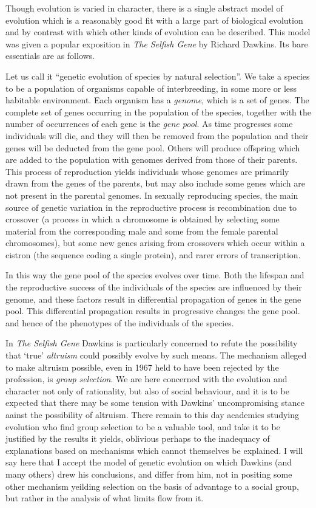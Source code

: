 \documentclass[10pt,titlepage]{article}
\begin{document}
Though evolution is varied in character, there is a single abstract model of evolution which is a reasonably good fit with a large part of biological evolution and by contrast with which other kinds of evolution can be described.
This model was given a popular exposition in \emph{The Selfish Gene}\cite{dawkinsSG} by Richard Dawkins.
Its bare essentials are as follows.

Let us call it ``genetic evolution of species by natural selection''.
We take a species to be a population of organisms capable of interbreeding, in some more or less habitable environment.
Each organism has a \emph{genome}, which is a set of genes.
The complete set of genes occurring in the population of the species, together with the number of occurrences of each gene is the \emph{gene pool}.
As time progresses some individuals will die, and they will then be removed from the population and their genes will be deducted from the gene pool.
Others will produce offspring which are added to the population with genomes derived from those of their parents.
This process of reproduction yields individuals whose genomes are primarily drawn from the genes of the parents, but may also include some genes which are not present in the parental genomes.
In sexually reproducing species, the main source of genetic variation in the reproductive process is recombination due to crossover (a process in which a chromosome is obtained by selecting some material from the corresponding male and some from the female parental chromosomes), but some new genes arising from crossovers which occur within a cistron (the sequence coding a single protein), and rarer errors of transcription. 


In this way the gene pool of the species evolves over time.
Both the lifespan and the reproductive success of the individuals of the species are influenced by their genome, and these factors result in differential propagation of genes in the gene pool.
This differential propagation results in progressive changes the gene pool. and hence of the phenotypes of the individuals of the species.

In \emph{The Selfish Gene} Dawkins is particularly concerned to refute the possibility that `true' \emph{altruism} could possibly evolve by such means.
The mechanism alleged to make altruism possible, even in 1967 held to have been rejected by the profession, is \emph{group selection}.
We are here concerned with the evolution and character not only of rationality, but also of social behaviour, and it is to be expected that there may be some tension with Dawkins' uncompromising stance aainst the possibility of altruism.
There remain to this day academics studying evolution who find group selection to be a valuable tool, and take it to be justified by the results it yields, oblivious perhaps to the inadequacy of explanations based on mechanisms which cannot themselves be explained.
I will say here that I accept the model of genetic evolution on which Dawkins (and many others) drew his conclusions, and differ from him, not in positing some other mechanism yeilding selection on the basis of advantage to a social group, but rather in the analysis of what limits flow from it.
\end{document}
